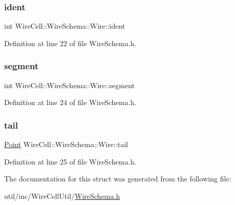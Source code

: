 \subsubsection{\texorpdfstring{ident}{ident}}
{\footnotesize\ttfamily int Wire\+Cell\+::\+Wire\+Schema\+::\+Wire\+::ident}



Definition at line 22 of file Wire\+Schema.\+h.

\mbox{\label{struct_wire_cell_1_1_wire_schema_1_1_wire_a448c811397ce24a74bb461283b3eaac9}} 
\subsubsection{\texorpdfstring{segment}{segment}}
{\footnotesize\ttfamily int Wire\+Cell\+::\+Wire\+Schema\+::\+Wire\+::segment}



Definition at line 24 of file Wire\+Schema.\+h.

\mbox{\label{struct_wire_cell_1_1_wire_schema_1_1_wire_a0189b8667a1dc1e045f221d062cf5027}} 
\subsubsection{\texorpdfstring{tail}{tail}}
{\footnotesize\ttfamily \hyperlink{namespace_wire_cell_ab2b2565fa6432efbb4513c14c988cda9}{Point} Wire\+Cell\+::\+Wire\+Schema\+::\+Wire\+::tail}



Definition at line 25 of file Wire\+Schema.\+h.



The documentation for this struct was generated from the following file\+:\begin{DoxyCompactItemize}
\item 
util/inc/\+Wire\+Cell\+Util/\hyperlink{_wire_schema_8h}{Wire\+Schema.\+h}\end{DoxyCompactItemize}
